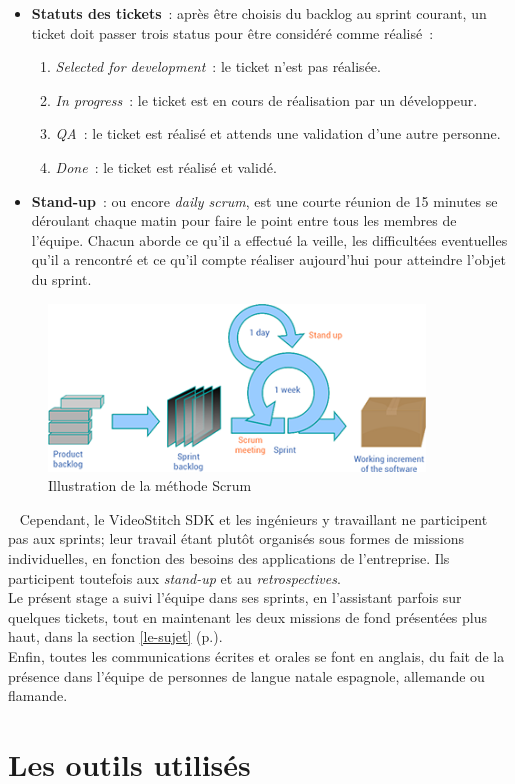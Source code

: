 \begin{itemize}
  \item \textbf{Statuts des tickets}~: après être choisis du backlog au sprint courant, 
  un ticket doit passer trois status pour être considéré comme réalisé~:
    \begin{enumerate}
      \item \textit{Selected for development}~: le ticket n'est pas réalisée.
      \item \textit{In progress}~: le ticket est en cours de réalisation par un développeur.
      \item \textit{QA}~: le ticket est réalisé et attends une validation d'une autre personne.
      \item \textit{Done}~: le ticket est réalisé et validé. 
    \end{enumerate}
	\item \textbf{Stand-up}~: ou encore \textit{daily scrum}, est une courte réunion de 15 minutes
	se déroulant chaque matin pour faire le point entre tous les membres de l'équipe.
	Chacun aborde ce qu'il a effectué la veille, les difficultées eventuelles qu'il
	a rencontré et ce qu'il compte réaliser aujourd'hui pour atteindre l'objet du sprint.
\end{itemize}
\begin{figure}
  \centering
  \includegraphics[width=10cm]{images/scrum-process.png}
  \caption{Illustration de la méthode Scrum\cite{scrum-process}}
\end{figure}
\ \newline
Cependant, le VideoStitch SDK et les ingénieurs y travaillant ne participent pas
aux sprints; leur travail étant plutôt organisés sous formes de missions individuelles,
en fonction des besoins des applications de l'entreprise. Ils participent toutefois 
aux \textit{stand-up} et au \textit{retrospectives}.\\
Le présent stage a suivi l'équipe dans ses sprints, en l'assistant parfois sur quelques
tickets, tout en maintenant les deux missions de fond présentées plus haut, dans 
la section \ref{le-sujet} (p.\pageref{le-sujet}).\\
\newline
Enfin, toutes les communications écrites et orales se font en anglais, du fait
de la présence dans l'équipe de personnes de langue natale espagnole, allemande ou flamande.

\section{Les outils utilisés}
